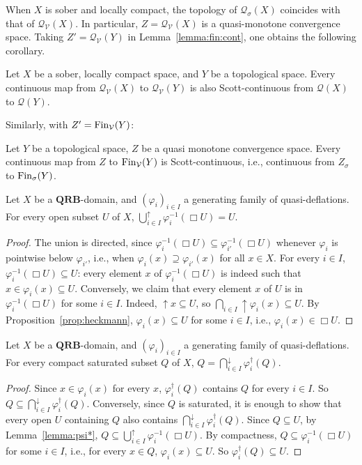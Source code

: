 \documentclass{LMCS}
\newcommand\Smyth{\mathcal Q}
\newcommand\V{{\mathcal V}}
\newcommand\SV{\Smyth_\V}
\newcommand\upc{\mathop{\uparrow}\nolimits}
\newcommand\QRB{\mathbf{QRB}}
\begin{document}
When $X$ is sober and locally compact, the topology of $\Smyth_\sigma
(X)$ coincides with that of $\SV (X)$.  In particular, $Z = \SV (X)$
is a quasi-monotone convergence space.  Taking $Z' = \SV (Y)$ in
Lemma~\ref{lemma:fin:cont}, one obtains the following corollary.
\begin{cor}
  \label{corl:fin:cont:Smyth}
  Let $X$ be a sober, locally compact space, and $Y$ be a topological
  space.  Every continuous map from $\SV (X)$ to $\SV (Y)$ is also
  Scott-continuous from $\Smyth (X)$ to $\Smyth (Y)$.
\end{cor}
Similarly, with $Z' = \Fin_\V (Y)$:
\begin{cor}
  \label{corl:fin:cont:Fin}
  Let $Y$ be a topological space, $Z$ be a quasi monotone convergence
  space.  Every continuous map from $Z$ to $\Fin_\V (Y)$ is
  Scott-continuous, i.e., continuous from $Z_\sigma$ to $\mathop{\text{Fin}}_\sigma
  (Y)$.
\end{cor}

\begin{lem}
  \label{lemma:psi*}
  Let $X$ be a $\QRB$-domain, and ${(\varphi_i)}_{i \in I}$ a
  generating family of quasi-deflations.  For every open subset $U$ of
  $X$, $\bigcup_{i \in I}^\uparrow \varphi_i^{-1} (\Box U) = U$.
\end{lem}
\begin{proof}
  The union is directed, since $\varphi_i^{-1} (\Box U) \subseteq
  \varphi_{i'}^{-1} (\Box U)$ whenever $\varphi_i$ is pointwise below
  $\varphi_{i'}$, i.e., when $\varphi_i (x) \supseteq \varphi_{i'}
  (x)$ for all $x \in X$.  For every $i \in I$, $\varphi_i^{-1} (\Box
  U) \subseteq U$: every element $x$ of $\varphi_i^{-1} (\Box U)$ is
  indeed such that $x \in \varphi_i (x) \subseteq U$.  Conversely, we
  claim that every element $x$ of $U$ is in $\varphi_i^{-1} (\Box U)$
  for some $i \in I$.  Indeed, $\upc x \subseteq U$, so $\bigcap_{i
    \in I} \upc \varphi_i (x) \subseteq U$.  By
  Proposition~\ref{prop:heckmann}, $\varphi_i (x) \subseteq U$ for
  some $i \in I$, i.e., $\varphi_i (x) \in \Box U$.
\end{proof}

\begin{lem}
  \label{lemma:psi*:comp}
  Let $X$ be a $\QRB$-domain, and ${(\varphi_i)}_{i \in I}$ a
  generating family of quasi-deflations.  For every compact saturated
  subset $Q$ of $X$, $Q = \bigcap_{i \in I}^\downarrow
  \varphi_i^\dagger (Q)$.
\end{lem}
\begin{proof}
  Since $x \in \varphi_i (x)$ for every
  $x$, $\varphi_i^\dagger (Q)$ contains $Q$ for every $i \in I$.  So $Q
  \subseteq \bigcap_{i \in I}^\downarrow \varphi_i^\dagger (Q)$.
  Conversely, since $Q$ is saturated, it is enough to show that every
  open $U$ containing $Q$ also contains $\bigcap_{i \in I}^\downarrow
  \varphi_i^\dagger (Q)$.  Since $Q \subseteq U$, by
  Lemma~\ref{lemma:psi*}, $Q \subseteq \bigcup_{i \in I}^\uparrow
  \varphi_i^{-1} (\Box U)$.  By compactness, $Q \subseteq
  \varphi_i^{-1} (\Box U)$ for some $i \in I$, i.e., for every $x \in
  Q$, $\varphi_i (x) \subseteq U$.  So $\varphi_i^\dagger (Q)
  \subseteq U$.
\end{proof}
\end{document}
